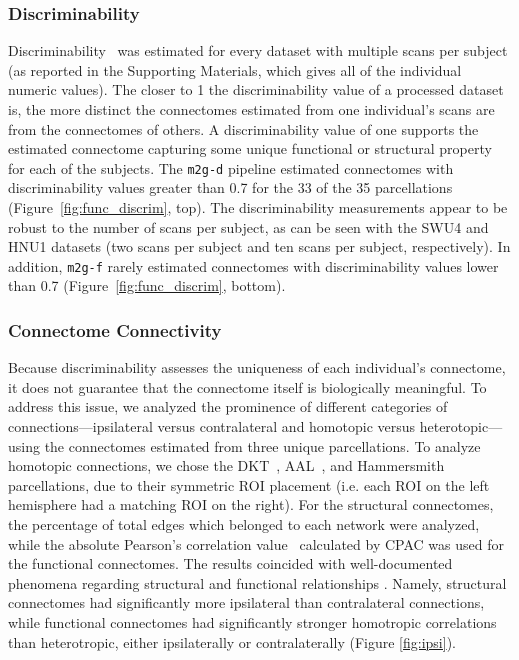 \subsubsection{Discriminability}
Discriminability~\cite{discriminability}  was estimated for every dataset with multiple scans per subject (as reported in the Supporting Materials, which gives all of the individual numeric values). The closer to 1 the discriminability value of a processed dataset is, the more distinct the connectomes estimated from one individual's scans are from the connectomes of others. A discriminability value of one supports the estimated connectome capturing some unique functional or structural property for each of the subjects. The \texttt{m2g-d} pipeline estimated connectomes with discriminability values  greater than 0.7 for the 33 of the 35 parcellations (Figure~\ref{fig:func_discrim}, top). The discriminability measurements appear to be robust to the number of scans per subject, as can be seen with the SWU4 and HNU1 datasets (two scans per subject and ten scans per subject, respectively). In addition, \texttt{m2g-f} rarely estimated connectomes with discriminability values lower than 0.7 (Figure~\ref{fig:func_discrim}, bottom).


\subsubsection{Connectome Connectivity}
Because discriminability assesses the uniqueness of each individual's connectome, it does not guarantee that the connectome itself is biologically meaningful. 
To address this issue, we analyzed the prominence of  different categories of connections---ipsilateral versus contralateral and   homotopic versus heterotopic---using the connectomes estimated from three unique parcellations. To analyze homotopic connections, we chose the DKT~\cite{desikan2006automated}, AAL~\cite{AAL}, and Hammersmith~\cite{Hammersmith} parcellations, due to their symmetric ROI placement (i.e. each ROI on the left hemisphere had a matching ROI on the right). For the structural connectomes, the percentage of total edges which belonged to each network were analyzed, while the absolute Pearson's correlation value~\cite{pearson} calculated by CPAC was used for the functional connectomes. The results coincided with well-documented phenomena regarding structural and functional relationships \cite{ipsi-struct,Stark-ipsi,Biswal-ipsi,Zuo-ipsi}. Namely, structural connectomes had significantly more ipsilateral than contralateral connections, while functional connectomes had significantly stronger homotropic correlations than heterotropic, either ipsilaterally or contralaterally (Figure \ref{fig:ipsi}). 

